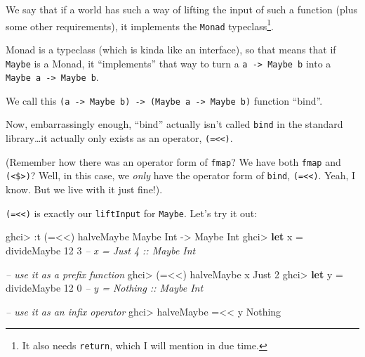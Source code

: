\documentclass[]{article}
\newenvironment{Shaded}{\begin{snugshade}}{\end{snugshade}}
\newcommand{\CommentTok}[1]{\textcolor[rgb]{0.56,0.35,0.01}{\textit{#1}}}
\newcommand{\DataTypeTok}[1]{\textcolor[rgb]{0.13,0.29,0.53}{#1}}
\newcommand{\DecValTok}[1]{\textcolor[rgb]{0.00,0.00,0.81}{#1}}
\newcommand{\FunctionTok}[1]{\textcolor[rgb]{0.00,0.00,0.00}{#1}}
\newcommand{\KeywordTok}[1]{\textcolor[rgb]{0.13,0.29,0.53}{\textbf{#1}}}
\newcommand{\NormalTok}[1]{#1}
\newcommand{\OtherTok}[1]{\textcolor[rgb]{0.56,0.35,0.01}{#1}}
\begin{document}
We say that if a world has such a way of lifting the input of such a function
(plus some other requirements), it implements the \texttt{Monad}
typeclass\footnote{It also needs \texttt{return}, which I will mention in due
  time.}.

Monad is a typeclass (which is kinda like an interface), so that means that if
\texttt{Maybe} is a Monad, it ``implements'' that way to turn a
\texttt{a\ -\textgreater{}\ Maybe\ b} into a
\texttt{Maybe\ a\ -\textgreater{}\ Maybe\ b}.

We call this
\texttt{(a\ -\textgreater{}\ Maybe\ b)\ -\textgreater{}\ (Maybe\ a\ -\textgreater{}\ Maybe\ b)}
function ``bind''.

Now, embarrassingly enough, ``bind'' actually isn't called \texttt{bind} in the
standard library\ldots{}it actually only exists as an operator,
\texttt{(=\textless{}\textless{})}.

(Remember how there was an operator form of \texttt{fmap}? We have both
\texttt{fmap} and \texttt{(\textless{}\$\textgreater{})}? Well, in this case, we
\emph{only} have the operator form of \texttt{bind},
\texttt{(=\textless{}\textless{})}. Yeah, I know. But we live with it just
fine!).

\texttt{(=\textless{}\textless{})} is exactly our \texttt{liftInput} for
\texttt{Maybe}. Let's try it out:

\begin{Shaded}
\begin{Highlighting}[]
\NormalTok{ghci}\FunctionTok{>} \FunctionTok{:}\NormalTok{t (}\FunctionTok{=<<}\NormalTok{) halveMaybe}
\DataTypeTok{Maybe} \DataTypeTok{Int} \OtherTok{->} \DataTypeTok{Maybe} \DataTypeTok{Int}
\NormalTok{ghci}\FunctionTok{>} \KeywordTok{let}\NormalTok{ x }\FunctionTok{=}\NormalTok{ divideMaybe }\DecValTok{12} \DecValTok{3}     \CommentTok{-- x = Just 4 :: Maybe Int}

\CommentTok{-- use it as a prefix function}
\NormalTok{ghci}\FunctionTok{>}\NormalTok{ (}\FunctionTok{=<<}\NormalTok{) halveMaybe x}
\DataTypeTok{Just} \DecValTok{2}
\NormalTok{ghci}\FunctionTok{>} \KeywordTok{let}\NormalTok{ y }\FunctionTok{=}\NormalTok{ divideMaybe }\DecValTok{12} \DecValTok{0}     \CommentTok{-- y = Nothing :: Maybe Int}

\CommentTok{-- use it as an infix operator}
\NormalTok{ghci}\FunctionTok{>}\NormalTok{ halveMaybe }\FunctionTok{=<<}\NormalTok{ y}
\DataTypeTok{Nothing}
\end{Highlighting}
\end{Shaded}
\end{document}
